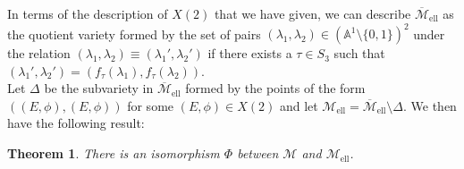 \documentclass{amsart}
\newcommand{\calM}{\mathcal{M}}
\newcommand{\mell}{\mathcal{M}_{\text{ell}}}
\newcommand{\mellc}{\overline{\mathcal{M}}_{\text{ell}}}
\numberwithin{equation}{section}
\newtheorem{theorem}{Theorem}[section]  %
\theoremstyle{definition}
\theoremstyle{remark}
\begin{document}
In terms of the description of $X(2)$ that we have given, we can describe
$\mellc$ as the quotient variety formed by the set of pairs $(\lambda_1,\lambda_2)\in(\mathbb{A}^1\setminus\{0,1\})^2$ under the relation $(\lambda_1,\lambda_2)\equiv(\lambda_1',\lambda_2')$ if there exists a $\tau\in S_3$ such that $(\lambda_1',\lambda_2')=(f_\tau(\lambda_1),f_\tau(\lambda_2))$.\\

Let $\Delta$ be the subvariety in $\mellc$ formed by the points of the form $((E,\phi),(E,\phi))$ for some $(E,\phi)\in X(2)$ and let $\mell=\mellc\setminus\Delta$. We then have the following result:

\begin{theorem} \label{iso_theorem}
There is an isomorphism $\Phi$ between $\calM$ and $\mell$.
\end{theorem}
\end{document}
